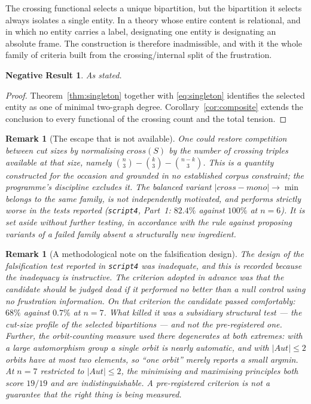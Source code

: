 \documentclass[11pt,a4paper]{article}
\def\mathrm#1{#1}%
\newtheorem{remark}[theorem]{Remark}
\newtheorem{negresult}[theorem]{Negative Result}
\newcommand{\Aut}{\mathrm{Aut}}
\newcommand{\cross}{\mathrm{cross}}
\newcommand{\mono}{\mathrm{mono}}
\begin{document}
\begin{negbox}
The crossing functional selects a unique bipartition, but the bipartition it selects always isolates a single entity. In a theory whose entire content is relational, and in which no entity carries a label, designating one entity is designating an absolute frame. The construction is therefore inadmissible, and with it the whole family of criteria built from the crossing/internal split of the frustration.
\end{negbox}

\begin{negresult}
\label{neg:C5dead}
As stated.
\end{negresult}

\begin{proof}
Theorem~\ref{thm:singleton} together with \eqref{eq:singleton} identifies the selected entity as one of minimal two-graph degree. Corollary~\ref{cor:composite} extends the conclusion to every functional of the crossing count and the total tension.
\end{proof}

\begin{remark}[The escape that is not available]
One could restore competition between cut sizes by normalising $\cross(S)$ by the number of crossing triples available at that size, namely $\binom{n}{3}-\binom{k}{3}-\binom{n-k}{3}$. This is a quantity constructed for the occasion and grounded in no established corpus constraint; the programme's discipline excludes it. The balanced variant $|\cross-\mono|\to\min$ belongs to the same family, is not independently motivated, and performs strictly worse in the tests reported (\texttt{script4}, Part~1: $82.4\%$ against $100\%$ at $n=6$). It is set aside without further testing, in accordance with the rule against proposing variants of a failed family absent a structurally new ingredient.
\end{remark}

\begin{remark}[A methodological note on the falsification design]
\label{rem:method}
The design of the falsification test reported in \texttt{script4} was inadequate, and this is recorded because the inadequacy is instructive. The criterion adopted in advance was that the candidate should be judged dead if it performed no better than a null control using no frustration information. On that criterion the candidate passed comfortably: $68\%$ against $0.7\%$ at $n=7$. What killed it was a subsidiary structural test --- the cut-size profile of the selected bipartitions --- and not the pre-registered one. Further, the orbit-counting measure used there degenerates at both extremes: with a large automorphism group a single orbit is nearly automatic, and with $|\Aut|\le2$ orbits have at most two elements, so ``one orbit'' merely reports a small argmin. At $n=7$ restricted to $|\Aut|\le2$, the minimising and maximising principles both score $19/19$ and are indistinguishable. A pre-registered criterion is not a guarantee that the right thing is being measured.
\end{remark}
\end{document}
